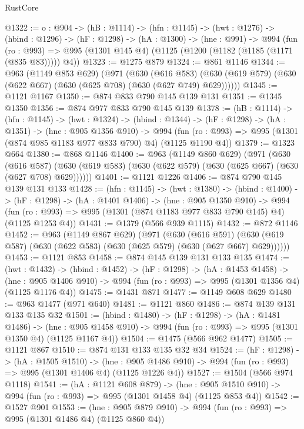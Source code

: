 \begin{lexlean}{RustCore}
\begin{coremodule}
@1322 := {o : @904} ->
  (hB : @1114) ->
  (hfn : @1145) ->
  (hwt : @1276) ->
  (hbind : @1296) ->
  (hF : @1298) ->
  (hA : @1300) ->
  (hne : @991) ->
  @994
    (fun (ro : @993) => @995 (@1301 @145 @4) (@1125 (@1200 (@1182 (@1185 (@1171 (@835 @83))))) @4))
@1323 := @1275 @879
@1324 := @861 @1146
@1344 := @963
    (@1149 @853 @629)
    (@971
      (@630
        (@616 @583)
        (@630 (@619 @579) (@630 (@622 @667) (@630 (@625 @708) (@630 (@627 @749) @629))))))
@1345 := @1121 @1167
@1350 := @874 @833 @790 @145 @139 @131
@1351 := @1345 @1350
@1356 := @874 @977 @833 @790 @145 @139
@1378 := (hB : @1114) ->
  (hfn : @1145) ->
  (hwt : @1324) ->
  (hbind : @1344) ->
  (hF : @1298) ->
  (hA : @1351) ->
  (hne : @905 @1356 @910) ->
  @994 (fun (ro : @993) => @995 (@1301 (@874 @985 @1183 @977 @833 @790) @4) (@1125 @1190 @4))
@1379 := @1323 @664
@1380 := @868 @1146
@1400 := @963
    (@1149 @860 @629)
    (@971
      (@630
        (@616 @587)
        (@630 (@619 @583) (@630 (@622 @579) (@630 (@625 @667) (@630 (@627 @708) @629))))))
@1401 := @1121 @1226
@1406 := @874 @790 @145 @139 @131 @133
@1428 := (hfn : @1145) ->
  (hwt : @1380) ->
  (hbind : @1400) ->
  (hF : @1298) ->
  (hA : @1401 @1406) ->
  (hne : @905 @1350 @910) ->
  @994 (fun (ro : @993) => @995 (@1301 (@874 @1183 @977 @833 @790 @145) @4) (@1125 @1253 @4))
@1431 := @1379 (@566 @939 @1115)
@1432 := @872 @1146
@1452 := @963
    (@1149 @867 @629)
    (@971
      (@630
        (@616 @591)
        (@630 (@619 @587) (@630 (@622 @583) (@630 (@625 @579) (@630 (@627 @667) @629))))))
@1453 := @1121 @853
@1458 := @874 @145 @139 @131 @133 @135
@1474 := (hwt : @1432) ->
  (hbind : @1452) ->
  (hF : @1298) ->
  (hA : @1453 @1458) ->
  (hne : @905 @1406 @910) -> @994 (fun (ro : @993) => @995 (@1301 @1356 @4) (@1125 @1176 @4))
@1475 := @1431 @871
@1477 := @1149 @608 @629
@1480 := @963 @1477 (@971 @640)
@1481 := @1121 @860
@1486 := @874 @139 @131 @133 @135 @32
@1501 := (hbind : @1480) ->
  (hF : @1298) ->
  (hA : @1481 @1486) ->
  (hne : @905 @1458 @910) -> @994 (fun (ro : @993) => @995 (@1301 @1350 @4) (@1125 @1167 @4))
@1504 := @1475 (@566 @962 @1477)
@1505 := @1121 @867
@1510 := @874 @131 @133 @135 @32 @34
@1524 := (hF : @1298) ->
  (hA : @1505 @1510) ->
  (hne : @905 @1486 @910) -> @994 (fun (ro : @993) => @995 (@1301 @1406 @4) (@1125 @1226 @4))
@1527 := @1504 (@566 @974 @1118)
@1541 := (hA : @1121 @608 @879) ->
  (hne : @905 @1510 @910) -> @994 (fun (ro : @993) => @995 (@1301 @1458 @4) (@1125 @853 @4))
@1542 := @1527 @901
@1553 := (hne : @905 @879 @910) -> @994 (fun (ro : @993) => @995 (@1301 @1486 @4) (@1125 @860 @4))

\end{coremodule}
\end{lexlean}
